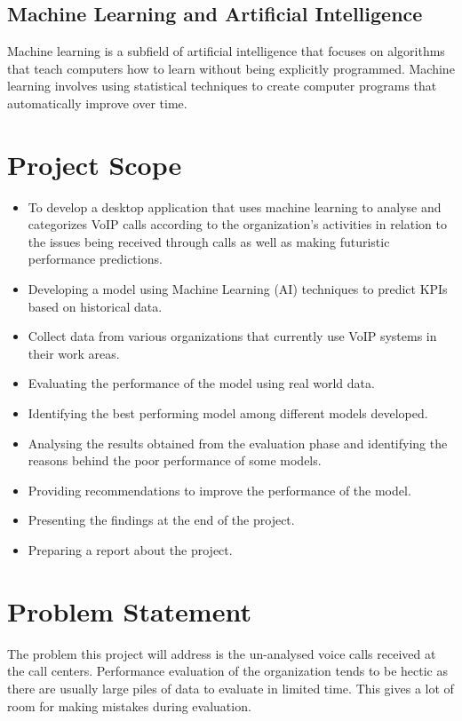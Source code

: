 \documentclass[conference]{IEEEtran}
\begin{document}
\subsection{Machine Learning and Artificial Intelligence}
Machine learning is a subfield of artificial intelligence that focuses on algorithms that teach computers how to learn without being explicitly programmed. Machine learning involves using statistical techniques to create computer programs that automatically improve over time.

\section{Project Scope}
\begin{itemize}
\item To develop a desktop application that uses machine learning to analyse and categorizes VoIP calls according to the organization’s activities in relation to the issues being received through calls as well as making futuristic performance predictions.
\item Developing a model using Machine Learning (AI) techniques to predict KPIs based on historical data.
\item Collect data from various organizations that currently use VoIP systems in their work areas.
\item Evaluating the performance of the model using real world data.
\item Identifying the best performing model among different models developed.
\item Analysing the results obtained from the evaluation phase and identifying the reasons behind the poor performance of some models.
\item Providing recommendations to improve the performance of the model.
\item Presenting the findings at the end of the project.
\item Preparing a report about the project.
\end{itemize}

\section{Problem Statement}
The problem this project will address is the un-analysed voice calls received at the call centers. Performance evaluation of the organization tends to be hectic as there are usually large piles of data to evaluate in limited time. This gives a lot of room for making mistakes during evaluation.
\end{document}
